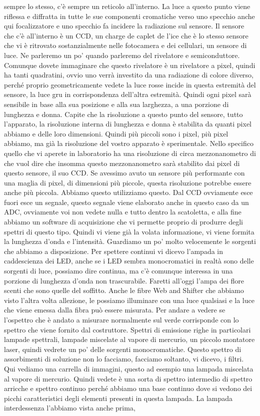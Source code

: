 sempre lo stesso, c'è sempre un reticolo all'interno. La luce a questo punto viene riflessa e diffratta in tutte le sue componenti cromatiche verso uno specchio anche qui focalizzatore e uno specchio fa incidere la radiazione sul sensore. Il sensore che c'è all'interno è un CCD, un charge de caplet de l'ice che è lo stesso sensore che vi è ritrovato sostanzialmente nelle fotocamera e dei cellulari, un sensore di luce. Ne parleremo un po' quando parleremo del rivelatore e semiconduttore. Comunque dovete immaginare che questo rivelatore è un rivelatore a pixel, quindi ha tanti quadratini, ovvio uno verrà investito da una radiazione di colore diverso, perché proprio geometricamente vedete la luce rosse incide in questa estremità del sensore, la luce gru in corrispondenza dell'altra estremità. Quindi ogni pixel sarà sensibile in base alla sua posizione e alla sua larghezza, a una porzione di lunghezza e donna. Capite che la risoluzione a questo punto del sensore, tutto l'apparato, la risoluzione interna di lunghezza e donna è stabilita da quanti pixel abbiamo e delle loro dimensioni. Quindi più piccoli sono i pixel, più pixel abbiamo, ma già la risoluzione del vostro apparato è sperimentale. Nello specifico quello che vi aperete in laboratorio ha una risoluzione di circa mezzonanometro di che vuol dire che insomma questo mezzonanometro sarà stabilito dai pixel di questo sensore, il suo CCD. Se avessimo avuto un sensore più performante con una maglia di pixel, di dimensioni più piccole, questa risoluzione potrebbe essere anche più piccola. Abbiamo questo utilizziamo questo. Dal CCD ovviamente esce fuori esce un segnale, questo segnale viene elaborato anche in questo caso da un ADC, ovviamente voi non vedete nulla e tutto dentro la scatoletta, e alla fine abbiamo un software di acquisizione che vi permette proprio di produrre degli spettri di questo tipo. Quindi vi viene già la volata informazione, vi viene formita la lunghezza d'onda e l'intensità. Guardiamo un po' molto velocemente le sorgenti che abbiamo a disposizione. Per spettere continui vi dicevo l'ampada in caddescienza dei LED, anche se i LED sembra monocromatici in realtà sono delle sorgenti di luce, possiamo dire continua, ma c'è comunque interessa in una porzione di lunghezza d'onda non trascurabile. Faretti all'oggi l'ampa dei flore scenti che sono quelle del soffitto. Anche le fibre Web and Shifter che abbiamo visto l'altra volta allezione, le possiamo illuminare con una luce qualsiasi e la luce che viene emessa dalla fibra può essere misurata. Per andare a vedere se l'ospettro che è andato a misurare normalmente sul verde corrisponde con lo spettro che viene fornito dal costruttore. Spettri di emissione righe in particolari lampade spettrali, lampade miscelate al vapore di mercurio, un piccolo montatore laser, quindi vedrete un po' delle sorgenti monocromatiche. Questo spettro di assorbimenti di soluzione non lo facciamo, facciamo soltanto, vi dicevo, i filtri. Qui vediamo una carrella di immagini, questo ad esempio una lampada miscelata al vapore di mercurio. Quindi vedete è una sorta di spettro intermedio di spettro arricche e spettro continuo perché abbiamo una base continuo dove si vedono dei picchi caratteristici degli elementi presenti in questa lampada. La lampada interdessenza l'abbiamo vista anche prima, 